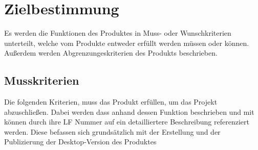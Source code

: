 \section{Zielbestimmung}
Es werden die Funktionen des Produktes in Muss- oder Wunschkriterien unterteilt, welche vom Produkte entweder erfüllt werden müssen oder können. Außerdem werden Abgrenzungeskriterien des Produkts beschrieben.
\subsection{Musskriterien}
Die folgenden Kriterien, muss das Produkt erfüllen, um das Projekt abzuschließen. Dabei werden dass anhand dessen Funktion beschrieben und mit können durch ihre LF Nummer auf ein detailliertere Beschreibung referenziert werden. Diese befassen sich grundsätzlich mit der Erstellung und der Publizierung der Desktop-Version des Produktes
